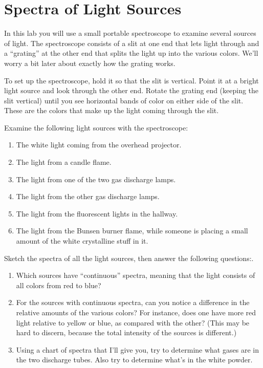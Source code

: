 \section{Spectra of Light Sources}

\makelabheader

\answerspace{1in}

In this lab 
you will use a small portable spectroscope to examine several sources
of light.  The spectroscope consists of a slit at one end that lets
light through and a ``grating'' at the other end that splits the light
up into the various colors.  We'll worry a bit later about exactly
how the grating works.

To set up the spectroscope, hold it so that the slit is vertical.  Point
it at a bright light source and look through the other end.  Rotate
the grating end (keeping the slit vertical) until you see horizontal
bands of color on either side of the slit.  These are the colors that
make up the light coming through the slit.

Examine the following light sources with the spectroscope:

\begin{enumerate}

\item The white light coming from the overhead projector.
\item The light from a candle flame.
\item The light from one of the two gas discharge lamps.
\item The light from the other gas discharge lamps.
\item The light from the fluorescent lights in the hallway.
\item The light from the Bunsen burner flame, while someone is placing
a small amount of the white crystalline stuff in it.

\end{enumerate}

Sketch the spectra of all the light sources, then
answer the following questions:.


\begin{enumerate}
\item Which sources have ``continuous'' spectra, meaning that the
light consists of all colors from red to blue?

\answerspace{1in}

\item For the sources with continuous spectra, can you notice
a difference in the relative amounts of the various colors?
For instance, does one have more red light relative to yellow
or blue, as compared with the other?  (This may be hard to discern,
because the total intensity of the sources is different.)

\answerspace{1in}

\item Using a chart of spectra that I'll give you, try to determine what gases
are in the two discharge tubes.  Also try to determine
what's in the white powder.

\answerspace{1in}

\end{enumerate}

